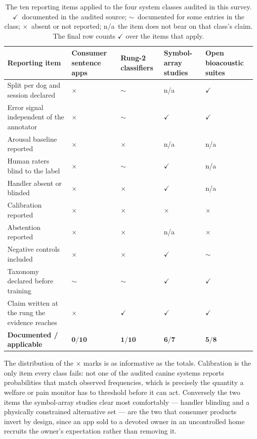 \begin{table}[htbp]
\centering
\caption{The ten reporting items applied to the four system classes audited in
this survey. $\checkmark$~documented in the audited source; $\sim$~documented
for some entries in the class; $\times$~absent or not reported; n/a~the item
does not bear on that class's claim. The final row counts $\checkmark$ over the
items that apply.}
\label{tab:checklist}
\footnotesize
\setlength{\tabcolsep}{4pt}
\begin{tabular}{@{}>{\raggedright\arraybackslash}p{4.7cm}
  >{\centering\arraybackslash}p{2.35cm}
  >{\centering\arraybackslash}p{2.15cm}
  >{\centering\arraybackslash}p{2.35cm}
  >{\centering\arraybackslash}p{2.15cm}@{}}
\toprule
\textbf{Reporting item} & \textbf{Consumer sentence apps} & \textbf{Rung-2 classifiers} & \textbf{Symbol-array studies} & \textbf{Open bioacoustic suites} \\
\midrule
Split per dog and session declared & $\times$ & $\sim$ & n/a & $\checkmark$ \\
Error signal independent of the annotator & $\times$ & $\sim$ & $\checkmark$ & $\checkmark$ \\
Arousal baseline reported & $\times$ & $\times$ & n/a & n/a \\
Human raters blind to the label & $\times$ & $\sim$ & $\checkmark$ & n/a \\
Handler absent or blinded & $\times$ & $\times$ & $\checkmark$ & n/a \\
Calibration reported & $\times$ & $\times$ & $\times$ & $\times$ \\
Abstention reported & $\times$ & $\times$ & n/a & $\times$ \\
Negative controls included & $\times$ & $\times$ & $\checkmark$ & $\sim$ \\
Taxonomy declared before training & $\sim$ & $\sim$ & $\checkmark$ & $\checkmark$ \\
Claim written at the rung the evidence reaches & $\times$ & $\checkmark$ & $\checkmark$ & $\checkmark$ \\
\midrule
\textbf{Documented / applicable} & $\mathbf{0/10}$ & $\mathbf{1/10}$ & $\mathbf{6/7}$ & $\mathbf{5/8}$ \\
\bottomrule
\end{tabular}
\end{table}

The distribution of the $\times$ marks is as informative as the totals.
Calibration is the only item every class fails: not one of the audited
canine systems reports probabilities that match observed frequencies, which
is precisely the quantity a welfare or pain monitor has to threshold before it
can act. Conversely the two items the symbol-array studies clear most
comfortably --- handler blinding and a physically constrained alternative set
--- are the two that consumer products invert by design, since an app sold to a
devoted owner in an uncontrolled home recruits the owner's expectation rather
than removing it.

